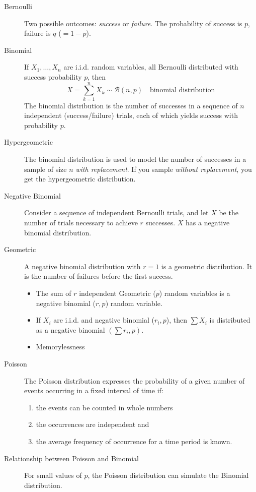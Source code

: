 \documentclass[a4paper,10pt,landscape]{article}
\begin{document}
\begin{multicols*}{3}
\begin{description}
	\item[Bernoulli] Two possible outcomes: {\it success} or {\it failure}. The probability of success is $p$, failure is $q$ ($=1-p$).
	\item[Binomial] If $X_1,\dots,X_n$ are i.i.d. random variables, all Bernoulli distributed with success probability $p$, then
	$$X=\sum_{k=1}^{n}X_k\sim\mathcal{B}(n,p)\quad\text{binomial distribution}$$
	The binomial distribution is the number of successes in a sequence of $n$ independent (success/failure) trials, each of which yields success with probability $p$.
	\item[Hypergeometric] The binomial distribution is used to model the number of successes in a sample of size $n$ {\it with replacement}. If you sample {\it without replacement}, you get the hypergeometric distribution.
	\item[Negative Binomial] Consider a sequence of independent Bernoulli trials, and let $X$ be the number of trials necessary to achieve $r$ successes. $X$ has a negative binomial distribution.
	\item[Geometric] A negative binomial distribution with $r=1$ is a geometric distribution. It is the number of failures before the first success.
	\begin{itemize}[noitemsep]
		\item The sum of $r$ independent Geometric ($p$) random variables is a negative binomial ($r,p$) random variable.
		\item If $X_i$ are i.i.d. and negative binomial ($r_i,p$), then $\sum X_i$ is distributed as a negative binomial $\left(\sum r_i,p\right)$.
		\item Memorylessness
	\end{itemize}
	\item[Poisson] The Poisson distribution expresses the probability of a given number of events occurring in a fixed interval of time if:
	\begin{enumerate}[itemsep=0pt,topsep=0pt]
		\item the events can be counted in whole numbers
		\item the occurrences are independent and
		\item the average frequency of occurrence for a time period is known.
	\end{enumerate}
	\item[Relationship between Poisson and Binomial] For small values of $p$, the Poisson distribution can simulate the Binomial distribution.

\end{description}
\end{multicols*}
\end{document}
